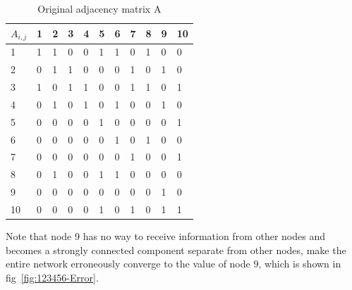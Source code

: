 \documentclass[conference]{IEEEtran}
\begin{document}
\begin{table}[htbp]
    \centering
    \caption{Original adjacency matrix A}
    \begin{tabular}{lllllllllll}
    \hline
    \hline
    $A_{i,j}$   & 1 & 2 & 3 & 4 & 5 & 6 & 7 & 8 & 9 & 10 \\ \hline
    1  & 1 & 1 & 0 & 0 & 1 & 1 & 0 & 1 & 0 & 0  \\
    2  & 0 & 1 & 1 & 0 & 0 & 0 & 1 & 0 & 1 & 0  \\
    3  & 1 & 0 & 1 & 1 & 0 & 0 & 1 & 1 & 0 & 1  \\
    4  & 0 & 1 & 0 & 1 & 0 & 1 & 0 & 0 & 1 & 0  \\
    5  & 0 & 0 & 0 & 0 & 1 & 0 & 0 & 0 & 0 & 1  \\
    6  & 0 & 0 & 0 & 0 & 0 & 1 & 0 & 1 & 0 & 0  \\
    7  & 0 & 0 & 0 & 0 & 0 & 0 & 1 & 0 & 0 & 1  \\
    8  & 0 & 1 & 0 & 0 & 1 & 1 & 0 & 0 & 0 & 0  \\
    9  & 0 & 0 & 0 & 0 & 0 & 0 & 0 & 0 & 1 & 0  \\
    10 & 0 & 0 & 0 & 0 & 1 & 0 & 1 & 0 & 1 & 1  \\
    \hline
    \hline
    \end{tabular}
    \label{tab:Error-A}
\end{table}

Note that node 9 has no way to receive information from other nodes and becomes a strongly connected component separate from other nodes, make the entire network erroneously converge to the value of node 9, which is shown in fig~\ref{fig:123456-Error}.
\end{document}
